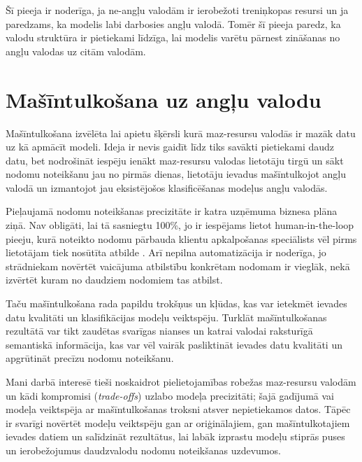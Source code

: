 Šī pieeja ir noderīga, ja ne-angļu valodām ir ierobežoti treniņkopas resursi un ja paredzams, ka modelis labi darbosies angļu valodā. 
Tomēr šī pieeja paredz, ka valodu struktūra ir pietiekami līdzīga, lai modelis varētu pārnest zināšanas no angļu valodas uz citām valodām. 


\section{Mašīntulkošana uz angļu valodu}


Mašīntulkošana izvēlēta lai apietu šķērsli kurā maz-resursu valodās ir mazāk datu uz kā apmācīt modeli. Ideja ir nevis gaidīt līdz tiks savākti pietiekami daudz datu, bet nodrošināt iespēju ienākt maz-resursu valodas lietotāju tirgū un sākt nodomu noteikšanu jau no pirmās dienas, lietotāju ievadus mašīntulkojot angļu valodā un izmantojot jau eksistējošos klasificēšanas modeļus angļu valodās. 

Pieļaujamā nodomu noteikšanas precizitāte ir katra uzņēmuma biznesa plāna ziņā. Nav obligāti, lai tā sasniegtu 100\%, jo ir iespējams lietot human-in-the-loop pieeju, kurā noteikto nodomu pārbauda klientu apkalpošanas speciālists vēl pirms lietotājam tiek nosūtīta atbilde \cite{paikens2020}. Arī nepilna automatizācija ir noderīga, jo strādniekam novērtēt vaicājuma atbilstību konkrētam nodomam ir vieglāk, nekā izvērtēt kuram no daudziem nodomiem tas atbilst.

Taču mašīntulkošana rada papildu trokšņus un kļūdas, kas var ietekmēt ievades datu kvalitāti un klasifikācijas modeļu veiktspēju. Turklāt mašīntulkošanas rezultātā var tikt zaudētas svarīgas nianses un katrai valodai raksturīgā semantiskā informācija, kas var vēl vairāk pasliktināt ievades datu kvalitāti un apgrūtināt precīzu nodomu noteikšanu.

Mani darbā interesē tieši noskaidrot pielietojamības robežas maz-resursu valodām un kādi kompromisi (\textit{trade-offs}) uzlabo modeļa precizitāti; šajā gadījumā vai modeļa veiktspēja ar mašīntulkošanas troksni atsver nepietiekamos datos. Tāpēc ir svarīgi novērtēt modeļu veiktspēju gan ar oriģinālajiem, gan mašīntulkotajiem ievades datiem un salīdzināt rezultātus, lai labāk izprastu modeļu stiprās puses un ierobežojumus daudzvalodu nodomu noteikšanas uzdevumos.

